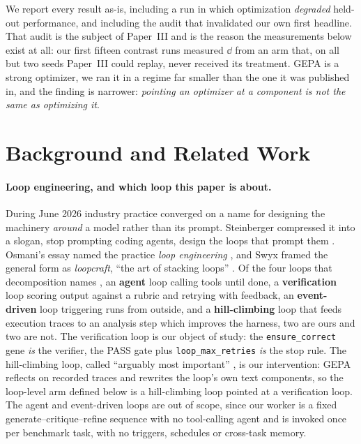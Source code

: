 \documentclass[11pt]{article}
\begin{document}
We report every result as-is, including a run in which optimization \emph{degraded} held-out
performance, and including the audit that invalidated our own first headline. That audit is the
subject of Paper~III and is the reason the measurements below exist at all: our first fifteen
contrast runs measured $\dd$ from an arm that, on all but two seeds Paper~III could replay, never
received its treatment. GEPA is a strong optimizer, we ran it in a regime far smaller than the
one it was published in, and the finding is narrower: \emph{pointing an optimizer at a
component is not the same as optimizing it}.

\section{Background and Related Work}
\label{sec:related}

\paragraph{Loop engineering, and which loop this paper is about.}
During June 2026 industry practice converged on a name for designing the machinery
\emph{around} a model rather than its prompt. Steinberger compressed it into a slogan,
stop prompting coding agents, design the loops that prompt them
\citep{steinberger2026loops}. Osmani's essay named the practice \emph{loop engineering}
\citep{osmani2026loop}, and Swyx framed the general form as \emph{loopcraft}, ``the art of
stacking loops'' \citep{swyx2026loopcraft}. Of the four loops that decomposition names
\citep{langchain2026loopcraft}, an \textbf{agent} loop calling tools until done, a
\textbf{verification} loop scoring output against a rubric and retrying with feedback, an
\textbf{event-driven} loop triggering runs from outside, and a \textbf{hill-climbing} loop that
feeds execution traces to an analysis step which improves the harness, two are ours and two are
not. The verification loop is our object of study: the \texttt{ensure\_correct} gene \emph{is} the
verifier, the PASS gate plus \texttt{loop\_max\_retries} \emph{is} the stop rule. The hill-climbing
loop, called ``arguably most important'' \citep{langchain2026loopcraft}, is our intervention: GEPA
reflects on recorded traces and rewrites the loop's own text components, so the loop-level arm defined below is a
hill-climbing loop pointed at a verification loop. The agent and event-driven loops are out of
scope, since our worker is a fixed generate--critique--refine sequence with no tool-calling agent
and is invoked once per benchmark task, with no triggers, schedules or cross-task memory.
\end{document}
